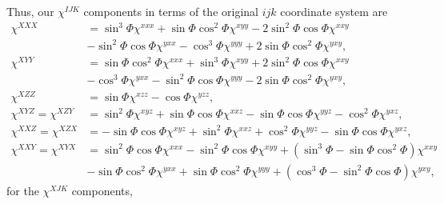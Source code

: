\documentclass[aps,prb,10pt,letterpaper,notitlepage]{revtex4-1}
\begin{document}
Thus, our $\chi^{IJK}$ components in terms of the original $ijk$ coordinate
system are
\begin{equation}\label{eq:xcomps}
\begin{split}
\chi^{XXX} 
&=  \sin^{3}\Phi          \chi^{xxx}
 +  \sin\Phi \cos^{2}\Phi \chi^{xyy}
 - 2\sin^{2}\Phi \cos\Phi \chi^{xxy}\\
&-  \sin^{2}\Phi \cos\Phi \chi^{yxx}
 -  \cos^{3}\Phi          \chi^{yyy}
 + 2\sin\Phi \cos^{2}\Phi \chi^{yxy},\\[10pt]
\chi^{XYY} 
&=  \sin\Phi \cos^{2}\Phi \chi^{xxx}
 +  \sin^{3}\Phi          \chi^{xyy}
 + 2\sin^{2}\Phi \cos\Phi \chi^{xxy}\\
&-  \cos^{3}\Phi          \chi^{yxx}
 -  \sin^{2}\Phi \cos\Phi \chi^{yyy}
 - 2\sin\Phi \cos^{2}\Phi \chi^{yxy},\\[10pt]
\chi^{XZZ} 
&= \sin\Phi \chi^{xzz}
 - \cos\Phi \chi^{yzz},\\[10pt]
\chi^{XYZ} = \chi^{XZY}
&=
   \sin^{2}\Phi      \chi^{xyz}
 + \sin\Phi \cos\Phi \chi^{xxz}
 - \sin\Phi \cos\Phi \chi^{yyz}
 - \cos^{2}\Phi      \chi^{yxz},\\[10pt]
\chi^{XXZ} = \chi^{XZX}
&=
 - \sin\Phi \cos\Phi \chi^{xyz}
 + \sin^{2}\Phi      \chi^{xxz}
 + \cos^{2}\Phi      \chi^{yyz}
 - \sin\Phi \cos\Phi \chi^{yxz},\\[10pt]
\chi^{XXY} = \chi^{XYX} 
&= 
   \sin^{2}\Phi \cos\Phi \chi^{xxx}
 - \sin^{2}\Phi \cos\Phi \chi^{xyy}
 + (\sin^{3}\Phi - \sin\Phi \cos^{2}\Phi) \chi^{xxy}\\
&- \sin\Phi \cos^{2}\Phi \chi^{yxx}
 + \sin\Phi \cos^{2}\Phi \chi^{yyy}
 + (\cos^{3}\Phi - \sin^{2}\Phi \cos\Phi) \chi^{yxy},
\end{split}
\end{equation}
for the $\chi^{XJK}$ components,
\end{document}
